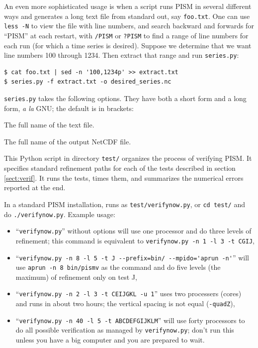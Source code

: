 \documentclass[11pt,final]{amsart}
\newcommand{\und}{\_\!\_}
\begin{document}
An even more sophisticated usage is when a script runs PISM in several different ways and generates a long text file from standard out, say \verb|foo.txt|.  One can use \verb|less -N| to view the file with line numbers, and search backward and forwards  for ``PISM'' at each restart, with \verb|/PISM| or  \verb|?PISM| to find a range of line numbers for each run (for which a time series is desired).  Suppose we determine that we want line numbers 100 through 1234.  Then extract that range and run \verb|series.py|:

\begin{verbatim}
$ cat foo.txt | sed -n '100,1234p' >> extract.txt
$ series.py -f extract.txt -o desired_series.nc
\end{verbatim}
\opthead  \verb|series.py| takes the following options.  They have both a short form and a long form, \emph{a la} GNU; the default is in brackets:

 The full name of the text file.

\scriptoptdef{o}{out}{series\und out.nc} The full name of the output NetCDF file.


  This Python script in directory \verb|test/| organizes the process of verifying PISM.  It specifies standard refinement paths for each of the tests described in section \ref{sect:verif}.  It runs the tests, times them, and summarizes the numerical errors reported at the end.

In a standard PISM installation, runs as \verb|test/verifynow.py|, or \verb|cd test/| and do \verb|./verifynow.py|.  Example usage: \begin{itemize}
\item ``\verb|verifynow.py|'' without options will use one processor and do three levels of refinement; this command is equivalent to \verb|verifynow.py -n 1 -l 3 -t CGIJ|,
\item ``\verb|verifynow.py -n 8 -l 5 -t J --prefix=bin/ --mpido='aprun -n'|'' will use \verb|aprun -n 8 bin/pismv| as the command and do five levels (the maximum) of refinement only on test J,
\item ``\verb|verifynow.py -n 2 -l 3 -t CEIJGKL -u 1|'' uses two processers (cores) and runs in about two hours; the vertical spacing is not equal (\verb|-quadZ|),
\item ``\verb|verifynow.py -n 40 -l 5 -t ABCDEFGIJKLM|'' will use forty processors to do all possible verification as managed by \verb|verifynow.py|; don't run this unless you have a big computer and you are prepared to wait.
\end{itemize}
\end{document}
